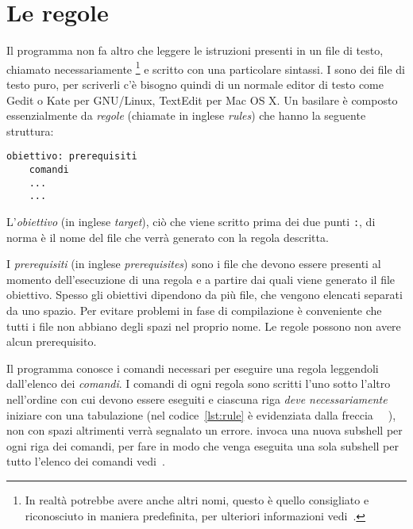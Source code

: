 \section{Le regole}
\label{sec:le-regole}

Il programma  non fa altro che leggere le istruzioni presenti in
un file di testo, chiamato necessariamente
\footnote{In realtà potrebbe avere anche altri nomi, questo
  è quello consigliato e riconosciuto in maniera predefinita, per ulteriori
  informazioni vedi~\cite[pagina 12]{gnu:make}.}
e scritto con una particolare sintassi.  I  sono dei file di
testo puro, per scriverli c'è bisogno quindi di un normale editor di testo come
Gedit o Kate per GNU/Linux, TextEdit per Mac OS X.  Un 
basilare è composto essenzialmente da \emph{regole} (chiamate in inglese
\emph{rules}) che hanno la seguente struttura:
\begin{lstlisting}[showtabs=true,tab=\rightarrowfill,caption={Struttura di una
    regola.  I comandi \emph{devono} essere preceduti da una tabulazione.},
  label=lst:rule]
obiettivo: prerequisiti
	comandi
	...
	...
\end{lstlisting}
L'\emph{obiettivo} (in inglese \emph{target}), ciò che viene scritto prima dei
due punti \texttt{:}, di norma è il nome del file che verrà generato con la
regola descritta.

I \emph{prerequisiti} (in inglese \emph{prerequisites}) sono i file che devono
essere presenti al momento dell'esecuzione di una regola e a partire dai quali
viene generato il file obiettivo.  Spesso gli obiettivi dipendono da più file,
che vengono elencati separati da uno spazio.  Per evitare problemi in fase di
compilazione è conveniente che tutti i file non abbiano degli spazi nel proprio
nome.  Le regole possono non avere alcun prerequisito.

Il programma  conosce i comandi necessari per eseguire una
regola leggendoli dall'elenco dei \emph{comandi}.  I comandi di ogni regola sono
scritti l'uno sotto l'altro nell'ordine con cui devono essere eseguiti e
ciascuna riga \emph{deve necessariamente} iniziare con una tabulazione (nel
codice~\ref{lst:rule} è evidenziata dalla freccia
\lstinline[showtabs=true,tab=\rightarrowfill]{	}), non con spazi altrimenti
verrà segnalato un errore.   invoca una nuova subshell per ogni
riga dei comandi, per fare in modo che venga eseguita una sola subshell per
tutto l'elenco dei comandi vedi~\cite[pagina 44]{gnu:make}.

